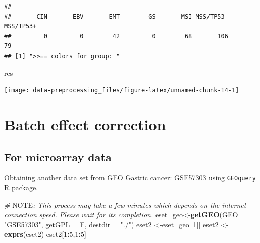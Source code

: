 \documentclass[
  12pt,
]{book}
\newenvironment{Shaded}{\begin{snugshade}}{\end{snugshade}}
\newcommand{\AlertTok}[1]{\textcolor[rgb]{0.94,0.16,0.16}{#1}}
\newcommand{\AttributeTok}[1]{\textcolor[rgb]{0.13,0.29,0.53}{#1}}
\newcommand{\CommentTok}[1]{\textcolor[rgb]{0.56,0.35,0.01}{\textit{#1}}}
\newcommand{\DecValTok}[1]{\textcolor[rgb]{0.00,0.00,0.81}{#1}}
\newcommand{\FunctionTok}[1]{\textcolor[rgb]{0.13,0.29,0.53}{\textbf{#1}}}
\newcommand{\NormalTok}[1]{#1}
\newcommand{\OtherTok}[1]{\textcolor[rgb]{0.56,0.35,0.01}{#1}}
\newcommand{\SpecialCharTok}[1]{\textcolor[rgb]{0.81,0.36,0.00}{\textbf{#1}}}
\newcommand{\StringTok}[1]{\textcolor[rgb]{0.31,0.60,0.02}{#1}}
\begin{document}
\begin{verbatim}
## 
##       CIN       EBV       EMT        GS       MSI MSS/TP53- MSS/TP53+ 
##         0         0        42         0        68       106        79 
## [1] ">>== colors for group: "
\end{verbatim}

\begin{Shaded}
\begin{Highlighting}[]
\NormalTok{res}
\end{Highlighting}
\end{Shaded}

\begin{center}\texttt{[image: data-preprocessing\_files/figure-latex/unnamed-chunk-14-1]} \end{center}

\hypertarget{batch-effect-correction}{%
\section{Batch effect correction}\label{batch-effect-correction}}

\hypertarget{for-microarray-data}{%
\subsection{For microarray data}\label{for-microarray-data}}

Obtaining another data set from GEO \href{https://www.ncbi.nlm.nih.gov/pubmed/24935174/}{Gastric cancer: GSE57303} using \texttt{GEOquery} R package.

\begin{Shaded}
\begin{Highlighting}[]
\CommentTok{\# }\AlertTok{NOTE}\CommentTok{: This process may take a few minutes which depends on the internet connection speed. Please wait for its completion.}
\NormalTok{eset\_geo}\OtherTok{\textless{}{-}}\FunctionTok{getGEO}\NormalTok{(}\AttributeTok{GEO     =} \StringTok{"GSE57303"}\NormalTok{, }\AttributeTok{getGPL  =}\NormalTok{ F, }\AttributeTok{destdir =} \StringTok{"./"}\NormalTok{)}
\NormalTok{eset2    }\OtherTok{\textless{}{-}}\NormalTok{eset\_geo[[}\DecValTok{1}\NormalTok{]]}
\NormalTok{eset2    }\OtherTok{\textless{}{-}}\FunctionTok{exprs}\NormalTok{(eset2)}
\NormalTok{eset2[}\DecValTok{1}\SpecialCharTok{:}\DecValTok{5}\NormalTok{,}\DecValTok{1}\SpecialCharTok{:}\DecValTok{5}\NormalTok{]}
\end{Highlighting}
\end{Shaded}
\end{document}

